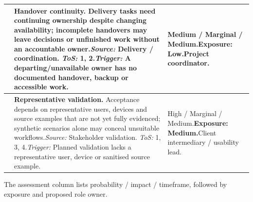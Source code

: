 {\begin{longtable}{L{0.11}L{0.62}L{0.27}}
\midrule
{}\label{risk:RS-11} & \textbf{Handover continuity.} Delivery tasks need continuing ownership despite changing availability; incomplete handovers may leave decisions or unfinished work without an accountable owner.\newline\textit{Source:} Delivery / coordination. \textit{ToS:} 1, 2.\newline\textit{Trigger:} A departing/unavailable owner has no documented handover, backup or accessible work. & Medium / Marginal / Medium.\newline\textbf{Exposure: Low.}\newline Project coordinator.\\
\midrule
{}\label{risk:RS-12} & \textbf{Representative validation.} Acceptance depends on representative users, devices and source examples that are not yet fully evidenced; synthetic scenarios alone may conceal unsuitable workflows.\newline\textit{Source:} Stakeholder validation. \textit{ToS:} 1, 3, 4.\newline\textit{Trigger:} Planned validation lacks a representative user, device or sanitised source example. & High / Marginal / Medium.\newline\textbf{Exposure: Medium.}\newline Client intermediary / usability lead.\\
\end{longtable}}
The assessment column lists probability / impact / timeframe, followed by exposure and proposed role owner.
